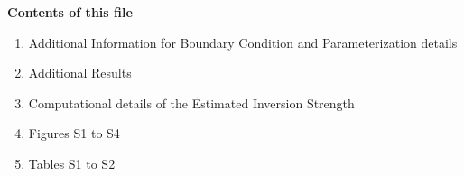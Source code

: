 \documentclass[draft,grl]{agutexSI}
\begin{document}
%

\begin{article}

%
%



\noindent\textbf{Contents of this file}
\begin{enumerate}
\item Additional Information for Boundary Condition and Parameterization details
\item Additional Results
\item Computational details of the Estimated Inversion Strength
\item Figures S1 to S4
\item Tables S1 to S2
\end{enumerate}


\end{article}
\end{document}
